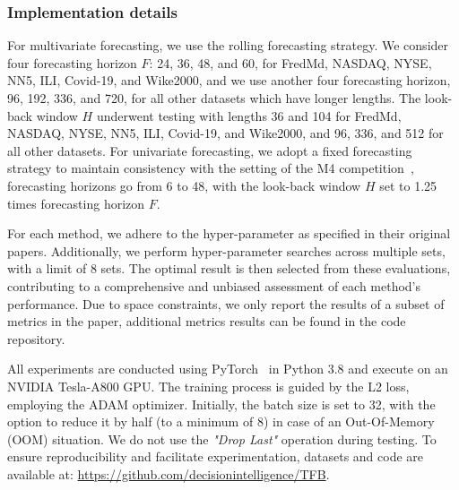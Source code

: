 \documentclass[sigconf, nonacm, pdfa]{acmart}
\begin{document}
\subsubsection{Implementation details} 
For multivariate forecasting, we use the rolling forecasting strategy. We consider four forecasting horizon $F$: {24, 36, 48, and 60,} for FredMd, NASDAQ, NYSE, NN5, ILI, Covid-19, and Wike2000, and we use another four forecasting horizon, {96, 192, 336, and 720,} for all other datasets which have longer lengths. The look-back window $H$ underwent testing with lengths {36 and 104} for FredMd, NASDAQ, NYSE, NN5, ILI, Covid-19, and Wike2000, and {96, 336, and 512} for all other datasets. For univariate forecasting, we adopt a fixed forecasting strategy to maintain consistency with the setting of the M4 competition~\cite{makridakis2018m4}, forecasting horizons go from 6 to 48, with the look-back window $H$ set to 1.25 times forecasting horizon $F$. 

For each method, we adhere to the hyper-parameter as specified in their original papers. Additionally, we perform hyper-parameter searches across multiple sets, with a limit of 8 sets. The optimal result is then selected from these evaluations, contributing to a comprehensive and unbiased assessment of each method's performance. Due to space constraints, we only report the results of a subset of metrics in the paper, additional metrics results can be found in the code repository.

All experiments are conducted using PyTorch~\cite{paszke2019pytorch} in Python 3.8 and execute on an NVIDIA Tesla-A800 GPU. The training process is guided by the L2 loss, employing the ADAM optimizer. Initially, the batch size is set to 32, with the option to reduce it by half (to a minimum of 8) in case of an Out-Of-Memory (OOM) situation. We do not use the \textit {"Drop Last"} operation during testing. To ensure reproducibility and facilitate experimentation, datasets and code are available at: \href{https://github.com/decisionintelligence/TFB}{https://github.com/decisionintelligence/TFB}.
\end{document}
